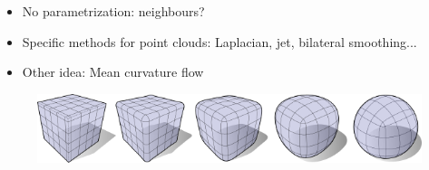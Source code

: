 \documentclass{beamer}
\begin{document}
\begin{frame}
    \begin{itemize}
        \item No parametrization: neighbours?
        \item Specific methods for point clouds: Laplacian, jet, bilateral
            smoothing...
        \item Other idea: Mean curvature flow
    \end{itemize}

    \begin{figure}
        \centering
        \includegraphics[scale=0.25]{img/mean-curvature-flow-cube}
    \end{figure}
\end{frame}
\end{document}
